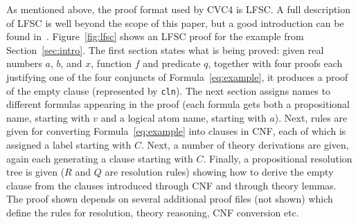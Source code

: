 \documentclass{llncs}
\begin{document}
As mentioned above, the proof format used by CVC4 is LFSC.  A full description
of LFSC is well beyond the scope of this paper, but a good introduction can be
found in~\cite{SOR+13}.
Figure~\ref{fig:lfsc} shows an LFSC proof for the example from
Section~\ref{sec:intro}.
The first section states what is being proved: given real numbers $a$, $b$, and
$x$, function $f$ and predicate $q$, together with four proofs each justifying
one of the four conjuncts of Formula~\ref{eq:example}, it produces a proof of
the empty clause (represented by {\tt cln}).  The next section assigns names to
different formulas appearing in the proof (each formula gets both a
propositional name, starting with $v$ and a logical atom name, starting with
$a$).  Next, rules are given for converting Formula~\ref{eq:example} into
clauses in CNF, each of which is assigned a label starting with $C$.  Next, a number of
theory derivations are given, again each generating a clause starting with
$C$.  Finally, a propositional resolution tree is given ($R$ and $Q$ are
resolution rules) showing how to derive
the empty clause from the clauses introduced through CNF and through theory
lemmas.  The proof shown depends on several additional proof files (not shown)
which define the rules for resolution, theory reasoning, CNF conversion etc.
\end{document}
